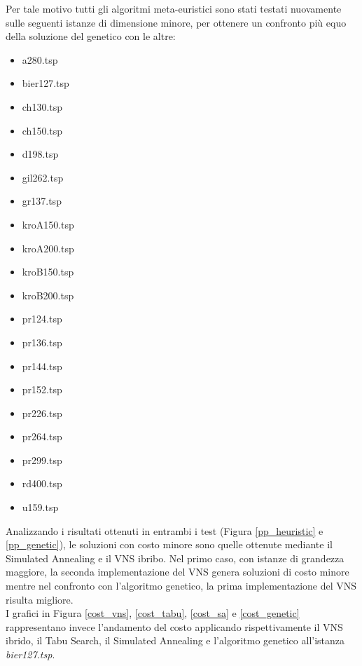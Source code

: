 Per tale motivo tutti gli algoritmi meta-euristici sono stati testati nuovamente sulle seguenti istanze di dimensione minore, per ottenere un confronto più equo della soluzione del genetico con le altre:
\begin{center}
\begin{multicols}{3}
\begin{itemize}
\item{a280.tsp}
\item{bier127.tsp}
\item{ch130.tsp}
\item{ch150.tsp}
\item{d198.tsp}
\item{gil262.tsp}
\item{gr137.tsp}
\item{kroA150.tsp}
\item{kroA200.tsp}
\item{kroB150.tsp}
\item{kroB200.tsp}
\item{pr124.tsp}
\item{pr136.tsp}
\item{pr144.tsp}
\item{pr152.tsp}
\item{pr226.tsp}
\item{pr264.tsp}
\item{pr299.tsp}
\item{rd400.tsp}
\item{u159.tsp}
\end{itemize}
\end{multicols}
\end{center}
Analizzando i risultati ottenuti in entrambi i test (Figura \ref{pp_heuristic} e \ref{pp_genetic}), le soluzioni con costo minore sono quelle ottenute mediante il Simulated Annealing e il VNS ibribo. Nel primo caso, con istanze di grandezza maggiore, la seconda implementazione del VNS genera soluzioni di costo minore mentre nel confronto con l'algoritmo genetico, la prima implementazione del VNS risulta migliore.\\
I grafici in Figura \ref{cost_vns}, \ref{cost_tabu}, \ref{cost_sa} e \ref{cost_genetic} rappresentano invece l'andamento del costo applicando rispettivamente il VNS ibrido, il Tabu Search, il Simulated Annealing e l'algoritmo genetico all'istanza \textit{bier127.tsp}.

